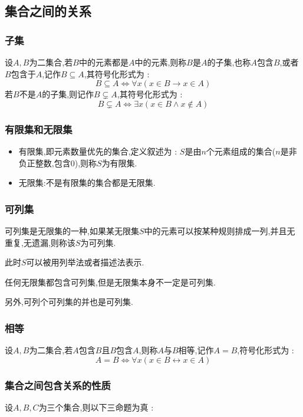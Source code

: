 {{\subsection{集合之间的关系}{

\subsubsection{子集}{
  设$A,B$为二集合,若$B$中的元素都是$A$中的元素,则称$B$是$A$的子集,也称$A$包含$B$,或者$B$包含于$A$,记作$B \subseteq A$,其符号化形式为 : $$
    B \subseteq A \Leftrightarrow \forall x (x \in B \to x \in A)
  $$
  若$B$不是$A$的子集,则记作$B \subsetneq A$,其符号化形式为 : $$
    B \subsetneq A \Leftrightarrow \exists x (x \in B \land x \notin A)
  $$
}%

\subsubsection{有限集和无限集}{
  \begin{itemize}
    \item 有限集,即元素数量优先的集合,定义叙述为 : $S$是由$n$个元素组成的集合($n$是非负正整数,包含0),则称$S$为有限集.
    \item 无限集:不是有限集的集合都是无限集.
  \end{itemize}
}%

\subsubsection{可列集}{
  可列集是无限集的一种,如果某无限集$S$中的元素可以按某种规则排成一列,并且无重复,无遗漏,则称该$S$为可列集.

  此时$S$可以被用列举法或者描述法表示.

  任何无限集都包含可列集,但是无限集本身不一定是可列集.

  另外,可列个可列集的并也是可列集.

}%

\subsubsection{相等}{
  设$A,B$为二集合,若$A$包含$B$且$B$包含$A$,则称$A$与$B$相等,记作$A = B$,符号化形式为 : $$
    A = B \Leftrightarrow \forall x (x \in B \leftrightarrow x \in A)
  $$
}%

\subsubsection{集合之间包含关系的性质}{
  设$A,B,C$为三个集合,则以下三命题为真 :

}}}}
